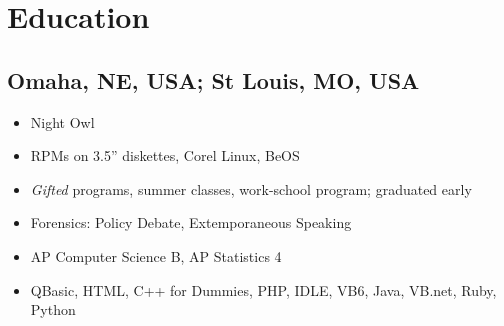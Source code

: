 \documentclass[letter,,openany,oneside]{sphinxhowto}
\begin{document}
\section{Education}
\label{resume:education}

\subsection{Omaha, NE, USA; St Louis, MO, USA}
\label{resume:omaha-ne-usa-st-louis-mo-usa}\begin{itemize}
\item {} 
Night Owl

\item {} 
RPMs on 3.5'' diskettes, Corel Linux, BeOS

\item {} 
\emph{Gifted} programs, summer classes, work-school program; graduated early

\item {} 
Forensics: Policy Debate, Extemporaneous Speaking

\item {} 
AP Computer Science B, AP Statistics 4

\item {} 
QBasic, HTML, C++ for Dummies, PHP, IDLE, VB6, Java, VB.net, Ruby, Python

\end{itemize}
\end{document}
